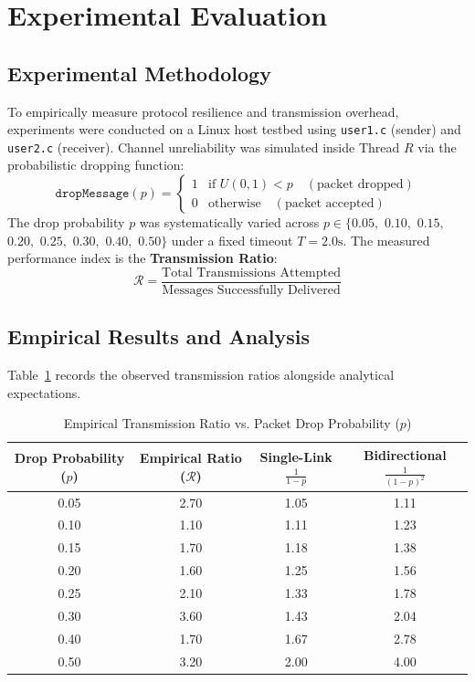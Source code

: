 \documentclass[11pt,a4paper]{article}
\begin{document}
\section{Experimental Evaluation}
\label{sec:evaluation}

\subsection{Experimental Methodology}
To empirically measure protocol resilience and transmission overhead, experiments were conducted on a Linux host testbed using \texttt{user1.c} (sender) and \texttt{user2.c} (receiver). Channel unreliability was simulated inside Thread $R$ via the probabilistic dropping function:
\begin{equation}
    \texttt{dropMessage}(p) = 
    \begin{cases}
        1 & \text{if } U(0, 1) < p \quad (\text{packet dropped}) \\
        0 & \text{otherwise} \quad (\text{packet accepted})
    \end{cases}
\end{equation}
The drop probability $p$ was systematically varied across $p \in \{0.05,$ $0.10,$ $0.15,$ $0.20,$ $0.25,$ $0.30,$ $0.40,$ $0.50\}$ under a fixed timeout $T = 2.0\text{s}$. The measured performance index is the \textbf{Transmission Ratio}:
\begin{equation}
    \mathcal{R} = \frac{\text{Total Transmissions Attempted}}{\text{Messages Successfully Delivered}}
\end{equation}

\subsection{Empirical Results and Analysis}
Table~\ref{tab:experimental_results} records the observed transmission ratios alongside analytical expectations.

\begin{table}[htbp]
\centering
\small
\caption{Empirical Transmission Ratio vs. Packet Drop Probability ($p$)}
\label{tab:experimental_results}
\begin{tabular}{cccc}
\toprule
\textbf{Drop Probability ($p$)} & \textbf{Empirical Ratio ($\mathcal{R}$)} & \textbf{Single-Link $\frac{1}{1-p}$} & \textbf{Bidirectional $\frac{1}{(1-p)^2}$} \\
\midrule
0.05 & 2.70 & 1.05 & 1.11 \\
0.10 & 1.10 & 1.11 & 1.23 \\
0.15 & 1.70 & 1.18 & 1.38 \\
0.20 & 1.60 & 1.25 & 1.56 \\
0.25 & 2.10 & 1.33 & 1.78 \\
0.30 & 3.60 & 1.43 & 2.04 \\
0.40 & 1.70 & 1.67 & 2.78 \\
0.50 & 3.20 & 2.00 & 4.00 \\
\bottomrule
\end{tabular}
\end{table}
\end{document}
